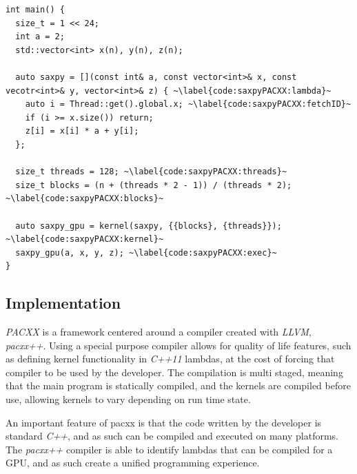 \begin{lstlisting}[caption={\textit{SAXPY} implementation made with \textit{PACXX}.}, label={code:saxpyPACXX}]
int main() {
  size_t = 1 << 24;
  int a = 2;
  std::vector<int> x(n), y(n), z(n);

  auto saxpy = [](const int& a, const vector<int>& x, const vecotr<int>& y, vector<int>& z) { ~\label{code:saxpyPACXX:lambda}~
    auto i = Thread::get().global.x; ~\label{code:saxpyPACXX:fetchID}~
    if (i >= x.size()) return;
    z[i] = x[i] * a + y[i];
  };

  size_t threads = 128; ~\label{code:saxpyPACXX:threads}~
  size_t blocks = (n + (threads * 2 - 1)) / (threads * 2); ~\label{code:saxpyPACXX:blocks}~

  auto saxpy_gpu = kernel(saxpy, {{blocks}, {threads}}); ~\label{code:saxpyPACXX:kernel}~
  saxpy_gpu(a, x, y, z); ~\label{code:saxpyPACXX:exec}~
}
\end{lstlisting}

\subsection{Implementation}
\textit{PACXX} is a framework centered around a compiler created with \textit{LLVM}, \textit{pacxx++}. Using a special purpose compiler allows for quality of life features, such as defining kernel functionality in \textit{C++11} lambdas, at the cost of forcing that compiler to be used by the developer. The compilation is multi staged, meaning that the main program is statically compiled, and the kernels are compiled before use, allowing kernels to vary depending on run time state.

An important feature of pacxx is that the code written by the developer is standard \textit{C++}, and as such can be compiled and executed on many platforms. The \textit{pacxx++} compiler is able to identify lambdas that can be compiled for a GPU, and as such create a unified programming experience.

